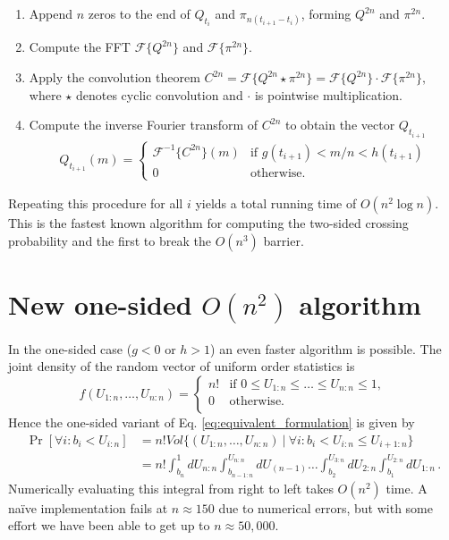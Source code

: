 \documentclass[a0,portrait]{a0poster}
\renewcommand{\emph}[1]{{\color{emphtextcolor}#1}}
\newcommand{\pr}[1]{\Pr \left[ #1 \right]}
\newcommand{\sectiontitle}[1]{\section*{\huge \color{textcolor}#1}}
\begin{document}
{\begin{multicols}{2}
\begin{enumerate}
    \item Append $n$ zeros to the end of $Q_{t_i}$ and $\pi_{n(t_{i+1}-t_i)}$,
    forming $Q^{2n}$ and $\pi^{2n}$.
    \item Compute the FFT $\mathcal{F}\{Q^{2n}\}$ and $\mathcal{F}\{\pi^{2n}\}$.
    \item Apply the convolution theorem
    \(
        C^{2n} = \mathcal{F}\{Q^{2n} \star \pi^{2n}\} = \mathcal{F} \{ Q^{2n}\} \cdot \mathcal{F}\{\pi^{2n}\},
    \)
    where $\star$ denotes cyclic convolution and $\cdot$ is pointwise multiplication.
    \item Compute the inverse Fourier transform of $C^{2n}$ to obtain the vector $Q_{t_{i+1}}$
    \begin{align*}
        Q_{t_{i+1}}(m) =
        \begin{cases}
            \mathcal{F}^{-1}\{C^{2n}\}(m) & \text{if }  g(t_{i+1}) < m/n < h(t_{i+1}) \\
            0 & \text{otherwise}.
        \end{cases}
    \end{align*}
\end{enumerate}
Repeating this procedure for all $i$ yields a total running time of $O(n^2 \log n)$.
\emph{This is the fastest known algorithm for computing the two-sided crossing probability and the first to break the $O(n^3)$ barrier.}

\sectiontitle{New one-sided $O(n^2)$ algorithm}
In the one-sided case ($g<0$ or $h>1$) an even faster algorithm is possible. 
The joint density of the random vector of uniform order statistics is
\[
    f(U_{1:n}, \ldots, U_{n:n}) = 
    \left\{\begin{array}{ll}
        n! & \mbox{if } 0 \le U_{1:n} \le \ldots \le U_{n:n} \le 1, \\
        0  & \mbox{otherwise}. \\
    \end{array}
    \right.
\]
Hence the one-sided variant of Eq. \eqref{eq:equivalent_formulation} is given by
\begin{align*}
    \pr{\forall i: b_i < U_{i:n}}
    &=
    n!Vol\{ (U_{1:n}, \ldots, U_{n:n}) \ |\ \forall i: b_i < U_{i:n} \le U_{i+1:n}\} \nonumber \\
    &=  \displaystyle n! \int_{b_n}^1 dU_{n:n} \int_{b_{n-1:n}}^{U_{n:n}} dU_{(n-1)} \ldots \int_{b_2}^{U_{3:n}} dU_{2:n} \int_{b_1}^{U_{2:n}} dU_{1:n} \,.
\end{align*}
Numerically evaluating this integral from right to left takes \(O(n^{2})\) time.
A na\"ive implementation fails at $n \approx 150$ due to  numerical errors,
but with some effort we have been able to get up to $n \approx 50,000$. \cite{MoscovichEigerNadlerSpiegelman2015}


\end{multicols}}
\end{document}
